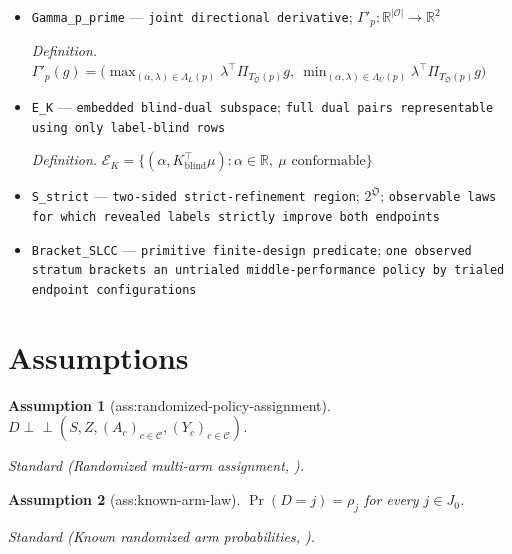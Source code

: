 \documentclass{article}
\newtheorem{assumption}{Assumption}
\begin{document}
\begin{itemize}
  \par\smallskip\noindent\emph{Definition.} \(\Lambda_U(p)=\operatorname*{argmin}_{(\alpha,\lambda)\in\mathcal D_U}\{\alpha+\lambda^{\top}p\}\)
  \item \texttt{Gamma\_\allowbreak{}p\_\allowbreak{}prime} --- \texttt{joint directional derivative}; \(\Gamma'_p:\mathbb R^{|\mathcal O|}\to\mathbb R^2\)
  \par\smallskip\noindent\emph{Definition.} \(\Gamma'_p(g)=\bigl(\max_{(\alpha,\lambda)\in\Lambda_L(p)}\lambda^{\top}\Pi_{T_{\mathfrak O}(p)}g,\ \min_{(\alpha,\lambda)\in\Lambda_U(p)}\lambda^{\top}\Pi_{T_{\mathfrak O}(p)}g\bigr)\)
  \item \texttt{E\_\allowbreak{}K} --- \texttt{embedded blind-\allowbreak{}dual subspace}; \texttt{full dual pairs representable using only label-\allowbreak{}blind rows}
  \par\smallskip\noindent\emph{Definition.} \(\mathcal E_K=\{(\alpha,K_{\mathrm{blind}}^{\top}\mu):\alpha\in\mathbb R,\ \mu\text{ conformable}\}\)
  \item \texttt{S\_\allowbreak{}strict} --- \texttt{two-\allowbreak{}sided strict-\allowbreak{}refinement region}; \(2^{\mathfrak O}\); \texttt{observable laws for which revealed labels strictly improve both endpoints}
  \item \texttt{Bracket\_\allowbreak{}SLCC} --- \texttt{primitive finite-\allowbreak{}design predicate}; \texttt{one observed stratum brackets an untrialed middle-\allowbreak{}performance policy by trialed endpoint configurations}
\end{itemize}

\section{Assumptions}

\begin{assumption}[ass:randomized-policy-assignment]\label{ass:randomized-policy-assignment}
\(D\perp\!\!\!\perp (S,Z,(A_c)_{c\in\mathcal C},(Y_c)_{c\in\mathcal C})\).
\par\smallskip\noindent\emph{Standard} (Randomized multi-arm assignment, \cite{ImaiJiangGreinerHalenShin2023}).
\end{assumption}

\begin{assumption}[ass:known-arm-law]\label{ass:known-arm-law}
\(\Pr(D=j)=\rho_j\) for every \(j\in J_0\).
\par\smallskip\noindent\emph{Standard} (Known randomized arm probabilities, \cite{ImaiJiangGreinerHalenShin2023}).
\end{assumption}
\end{document}
